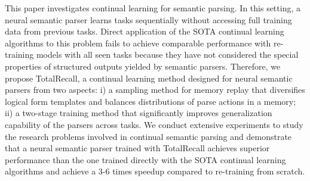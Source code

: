 This paper investigates continual learning for semantic parsing. In this setting, a neural semantic parser learns tasks sequentially without accessing full training data from previous tasks. Direct application of the SOTA continual learning algorithms to this problem fails to achieve comparable performance with re-training models with all seen tasks because they have not considered the special properties of structured outputs yielded by semantic parsers. Therefore, we propose TotalRecall, a continual learning method designed for neural semantic parsers from two aspects: i) a sampling method for memory replay that diversifies logical form templates and balances distributions of parse actions in a memory; ii) a two-stage training method that significantly improves generalization capability of the parsers across tasks. We conduct extensive experiments to study the research problems involved in continual semantic parsing and demonstrate that a neural semantic parser trained with TotalRecall achieves superior performance than the one trained directly with the SOTA continual learning algorithms and achieve a 3-6 times speedup compared to re-training from scratch.
